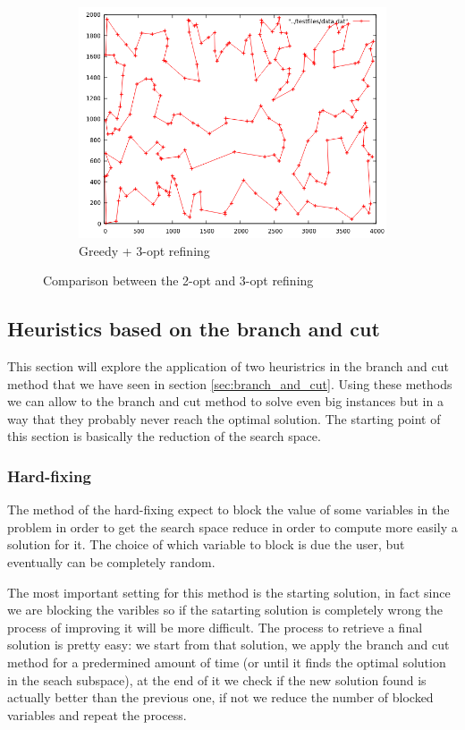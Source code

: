 \begin{figure}
\begin{subfigure}[b]{0.5\textwidth}
		\includegraphics[width=\textwidth]{images/3_opt}
		\caption{Greedy + 3-opt refining}
	\end{subfigure}
	\caption{Comparison between the 2-opt and 3-opt refining}
	\label{img:k_opt}
\end{figure}

\subsection{Heuristics based on the branch and cut}
This section will explore the application of two heuristrics in the branch and cut method that we have seen in section \ref{sec:branch_and_cut}. Using these methods we can allow to the branch and cut method to solve even big instances but in a way that they probably never reach the optimal solution. The starting point of this section is basically the reduction of the search space.


\subsubsection{Hard-fixing}
The method of the hard-fixing expect to block the value of some variables in the problem in order to get the search space reduce in order to compute more easily a solution for it. The choice of which variable to block is due the user, but eventually can be completely random. 

The most important setting for this method is the starting solution, in fact since we are blocking the varibles so if the satarting solution is completely wrong the process of improving it will be more difficult. The process to retrieve a final solution is pretty easy: we start from that solution, we apply the branch and cut method for a predermined amount of time (or until it finds the optimal solution in the seach subspace), at the end of it we check if the new solution found is actually better than the previous one, if not we reduce the number of blocked variables and repeat the process. 

